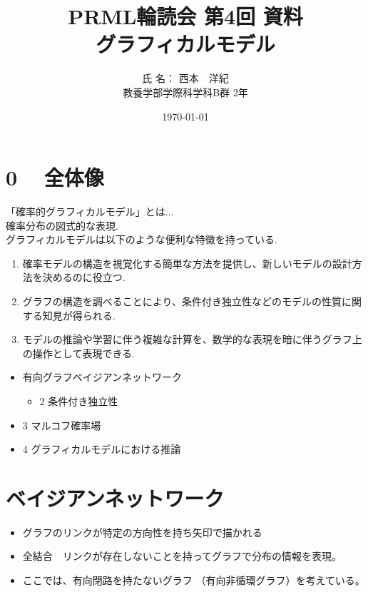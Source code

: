 \documentclass[11pt,a4paper]{jsarticle}
\begin{document}
\title{PRML輪読会 第4回 資料 \\
        グラフィカルモデル}
\author{氏 名： 西本　洋紀 \\
        教養学部学際科学科B群 2年
        }
\date{\today}
\maketitle
\section*{0 ~ 全体像}
「確率的グラフィカルモデル」とは...\\
確率分布の図式的な表現.\\
グラフィカルモデルは以下のような便利な特徴を持っている.
\begin{enumerate}
  \item 確率モデルの構造を視覚化する簡単な方法を提供し、新しいモデルの設計方法を決めるのに役立つ.
  \item グラフの構造を調べることにより、条件付き独立性などのモデルの性質に関する知見が得られる.
  \item モデルの推論や学習に伴う複雑な計算を、数学的な表現を暗に伴うグラフ上の操作として表現できる.
\end{enumerate}
\begin{itemize}
  \item 有向グラフベイジアンネットワーク
  \begin{itemize}
    \item 2 条件付き独立性
  \end{itemize}
  \item 3 マルコフ確率場
  \\
  \item 4 グラフィカルモデルにおける推論
\end{itemize}
\section{ベイジアンネットワーク}
\begin{itemize}
  \item グラフのリンクが特定の方向性を持ち矢印で描かれる
  \item 全結合　リンクが存在しないことを持ってグラフで分布の情報を表現。
  \item ここでは、有向閉路を持たないグラフ （有向非循環グラフ）を考えている。
\end{itemize}
\end{document}
